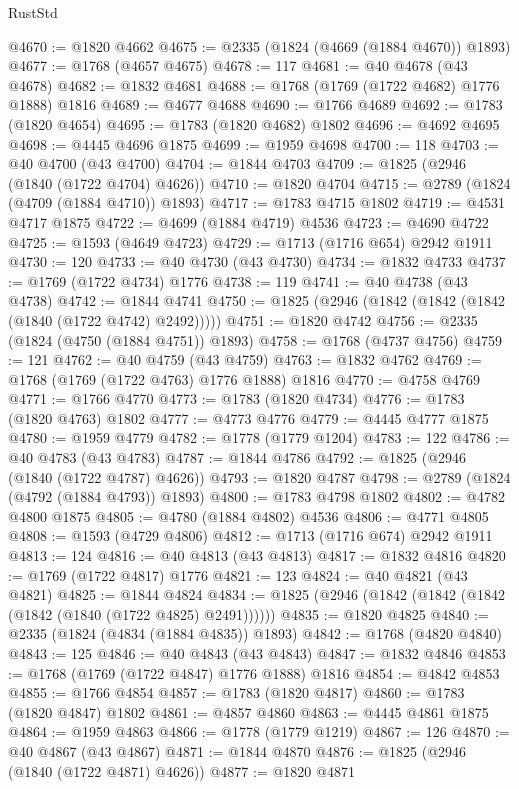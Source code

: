 \begin{lexlean}{RustStd}
\begin{coremodule}
@4670 := @1820 @4662
@4675 := @2335 (@1824 (@4669 (@1884 @4670)) @1893)
@4677 := @1768 (@4657 @4675)
@4678 := 117
@4681 := @40 @4678 (@43 @4678)
@4682 := @1832 @4681
@4688 := @1768 (@1769 (@1722 @4682) @1776 @1888) @1816
@4689 := @4677 @4688
@4690 := @1766 @4689
@4692 := @1783 (@1820 @4654)
@4695 := @1783 (@1820 @4682) @1802
@4696 := @4692 @4695
@4698 := @4445 @4696 @1875
@4699 := @1959 @4698
@4700 := 118
@4703 := @40 @4700 (@43 @4700)
@4704 := @1844 @4703
@4709 := @1825 (@2946 (@1840 (@1722 @4704) @4626))
@4710 := @1820 @4704
@4715 := @2789 (@1824 (@4709 (@1884 @4710)) @1893)
@4717 := @1783 @4715 @1802
@4719 := @4531 @4717 @1875
@4722 := @4699 (@1884 @4719) @4536
@4723 := @4690 @4722
@4725 := @1593 (@4649 @4723)
@4729 := @1713 (@1716 @654) @2942 @1911
@4730 := 120
@4733 := @40 @4730 (@43 @4730)
@4734 := @1832 @4733
@4737 := @1769 (@1722 @4734) @1776
@4738 := 119
@4741 := @40 @4738 (@43 @4738)
@4742 := @1844 @4741
@4750 := @1825 (@2946 (@1842 (@1842 (@1842 (@1840 (@1722 @4742) @2492)))))
@4751 := @1820 @4742
@4756 := @2335 (@1824 (@4750 (@1884 @4751)) @1893)
@4758 := @1768 (@4737 @4756)
@4759 := 121
@4762 := @40 @4759 (@43 @4759)
@4763 := @1832 @4762
@4769 := @1768 (@1769 (@1722 @4763) @1776 @1888) @1816
@4770 := @4758 @4769
@4771 := @1766 @4770
@4773 := @1783 (@1820 @4734)
@4776 := @1783 (@1820 @4763) @1802
@4777 := @4773 @4776
@4779 := @4445 @4777 @1875
@4780 := @1959 @4779
@4782 := @1778 (@1779 @1204)
@4783 := 122
@4786 := @40 @4783 (@43 @4783)
@4787 := @1844 @4786
@4792 := @1825 (@2946 (@1840 (@1722 @4787) @4626))
@4793 := @1820 @4787
@4798 := @2789 (@1824 (@4792 (@1884 @4793)) @1893)
@4800 := @1783 @4798 @1802
@4802 := @4782 @4800 @1875
@4805 := @4780 (@1884 @4802) @4536
@4806 := @4771 @4805
@4808 := @1593 (@4729 @4806)
@4812 := @1713 (@1716 @674) @2942 @1911
@4813 := 124
@4816 := @40 @4813 (@43 @4813)
@4817 := @1832 @4816
@4820 := @1769 (@1722 @4817) @1776
@4821 := 123
@4824 := @40 @4821 (@43 @4821)
@4825 := @1844 @4824
@4834 := @1825 (@2946 (@1842 (@1842 (@1842 (@1842 (@1840 (@1722 @4825) @2491))))))
@4835 := @1820 @4825
@4840 := @2335 (@1824 (@4834 (@1884 @4835)) @1893)
@4842 := @1768 (@4820 @4840)
@4843 := 125
@4846 := @40 @4843 (@43 @4843)
@4847 := @1832 @4846
@4853 := @1768 (@1769 (@1722 @4847) @1776 @1888) @1816
@4854 := @4842 @4853
@4855 := @1766 @4854
@4857 := @1783 (@1820 @4817)
@4860 := @1783 (@1820 @4847) @1802
@4861 := @4857 @4860
@4863 := @4445 @4861 @1875
@4864 := @1959 @4863
@4866 := @1778 (@1779 @1219)
@4867 := 126
@4870 := @40 @4867 (@43 @4867)
@4871 := @1844 @4870
@4876 := @1825 (@2946 (@1840 (@1722 @4871) @4626))
@4877 := @1820 @4871

\end{coremodule}
\end{lexlean}
